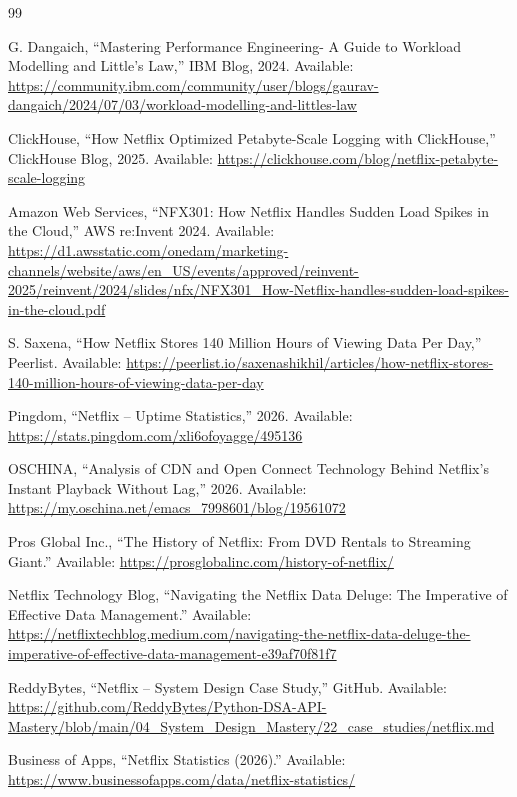 \documentclass{article}
\begin{document}
\begin{thebibliography}{99}

G. Dangaich,
``Mastering Performance Engineering- A Guide to Workload Modelling and Little's Law,”
IBM Blog, 2024.
Available:
\url{https://community.ibm.com/community/user/blogs/gaurav-dangaich/2024/07/03/workload-modelling-and-littles-law}

ClickHouse,
``How Netflix Optimized Petabyte-Scale Logging with ClickHouse,”
ClickHouse Blog, 2025.
Available:
\url{https://clickhouse.com/blog/netflix-petabyte-scale-logging}

Amazon Web Services,
``NFX301: How Netflix Handles Sudden Load Spikes in the Cloud,”
AWS re:Invent 2024.
Available:
\url{https://d1.awsstatic.com/onedam/marketing-channels/website/aws/en_US/events/approved/reinvent-2025/reinvent/2024/slides/nfx/NFX301_How-Netflix-handles-sudden-load-spikes-in-the-cloud.pdf}

S. Saxena,
``How Netflix Stores 140 Million Hours of Viewing Data Per Day,”
Peerlist.
Available:
\url{https://peerlist.io/saxenashikhil/articles/how-netflix-stores-140-million-hours-of-viewing-data-per-day}

Pingdom,
``Netflix -- Uptime Statistics,”
2026.
Available:
\url{https://stats.pingdom.com/xli6ofoyagge/495136}

OSCHINA,
``Analysis of CDN and Open Connect Technology Behind Netflix's Instant
Playback Without Lag,”
2026.
Available:
\url{https://my.oschina.net/emacs_7998601/blog/19561072}

Pros Global Inc.,
``The History of Netflix: From DVD Rentals to Streaming Giant.”
Available:
\url{https://prosglobalinc.com/history-of-netflix/}

Netflix Technology Blog,
``Navigating the Netflix Data Deluge: The Imperative of Effective Data Management.”
Available:
\url{https://netflixtechblog.medium.com/navigating-the-netflix-data-deluge-the-imperative-of-effective-data-management-e39af70f81f7}

ReddyBytes,
``Netflix -- System Design Case Study,”
GitHub.
Available:
\url{https://github.com/ReddyBytes/Python-DSA-API-Mastery/blob/main/04_System_Design_Mastery/22_case_studies/netflix.md}

Business of Apps,
``Netflix Statistics (2026).”
Available:
\url{https://www.businessofapps.com/data/netflix-statistics/}

\end{thebibliography}
\end{document}
